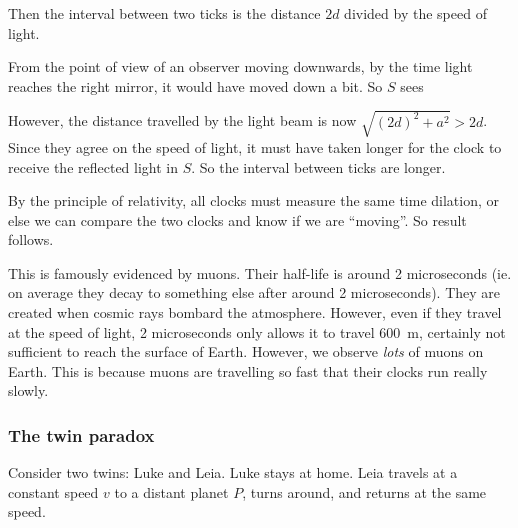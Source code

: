 \documentclass[a4paper]{article}
\begin{document}
Then the interval between two ticks is the distance $2d$ divided by the speed of light.
\begin{center}
\end{center}

From the point of view of an observer moving downwards, by the time light reaches the right mirror, it would have moved down a bit. So $S$ sees
\begin{center}
\end{center}
However, the distance travelled by the light beam is now $\sqrt{(2d)^2 + a^2} > 2d$. Since they agree on the speed of light, it must have taken longer for the clock to receive the reflected light in $S$. So the interval between ticks are longer.

By the principle of relativity, all clocks must measure the same time dilation, or else we can compare the two clocks and know if we are ``moving''. So result follows.

This is famously evidenced by muons. Their half-life is around 2 microseconds (ie. on average they decay to something else after around 2 microseconds). They are created when cosmic rays bombard the atmosphere. However, even if they travel at the speed of light, 2 microseconds only allows it to travel \SI{600}{m}, certainly not sufficient to reach the surface of Earth. However, we observe \emph{lots} of muons on Earth. This is because muons are travelling so fast that their clocks run really slowly.

\subsubsection*{The twin paradox}
Consider two twins: Luke and Leia. Luke stays at home. Leia travels at a constant speed $v$ to a distant planet $P$, turns around, and returns at the same speed.
\end{document}
